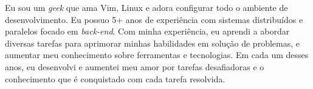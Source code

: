 

\begin{cvparagraph}

    Eu sou um \textit{geek} que ama Vim, Linux e adora configurar todo o
    ambiente de desenvolvimento. Eu possuo 5+ anos de experiência com sistemas
    distribuídos e paralelos focado em \textit{back-end}. Com minha experiência,
    eu aprendi a abordar diversas tarefas para aprimorar minhas habilidades em
    solução de problemas, e aumentar meu conhecimento sobre ferramentas e
    tecnologias. Em cada um desses anos, eu desenvolvi e aumentei meu amor por
    tarefas desafiadoras e o conhecimento que é conquistado com cada tarefa
    resolvida.

\end{cvparagraph}
